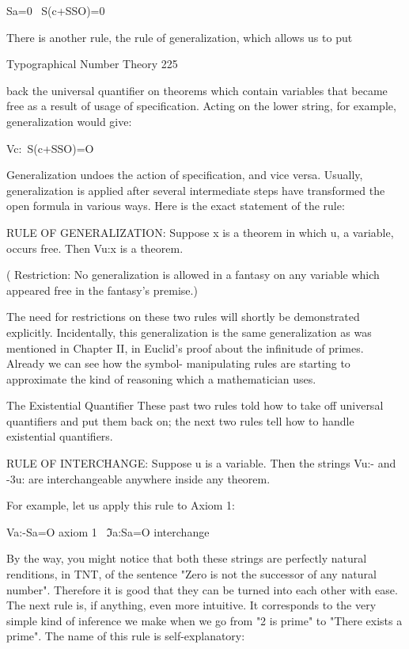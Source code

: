                                            Sa=0
                                       ~S(c+SSO)=0

There is another rule, the rule of generalization, which allows us to put


Typographical Number Theory                                                              225

back the universal quantifier on theorems which contain variables that became free as a
result of usage of specification. Acting on the lower string, for example, generalization
would give:

                                   Vc:~S(c+SSO)=O

Generalization undoes the action of specification, and vice versa. Usually, generalization
is applied after several intermediate steps have transformed the open formula in various
ways. Here is the exact statement of the rule:

RULE OF GENERALIZATION: Suppose x is a theorem in which u, a variable, occurs
free. Then Vu:x is a theorem.

       ( Restriction: No generalization is allowed in a fantasy on any variable which
       appeared free in the fantasy's premise.)

The need for restrictions on these two rules will shortly be demonstrated explicitly.
Incidentally, this generalization is the same generalization as was mentioned in Chapter
II, in Euclid's proof about the infinitude of primes. Already we can see how the symbol-
manipulating rules are starting to approximate the kind of reasoning which a
mathematician uses.

                            The Existential Quantifier
These past two rules told how to take off universal quantifiers and put them back on; the
next two rules tell how to handle existential quantifiers.

RULE OF INTERCHANGE: Suppose u is a variable. Then the strings Vu:- and -3u: are
interchangeable anywhere inside any theorem.

For example, let us apply this rule to Axiom 1:

                                Va:-Sa=O   axiom 1
                               ~ℑa:Sa=O  interchange

By the way, you might notice that both these strings are perfectly natural renditions, in
TNT, of the sentence "Zero is not the successor of any natural number". Therefore it is
good that they can be turned into each other with ease.
       The next rule is, if anything, even more intuitive. It corresponds to the very
simple kind of inference we make when we go from "2 is prime" to "There exists a
prime". The name of this rule is self-explanatory:

